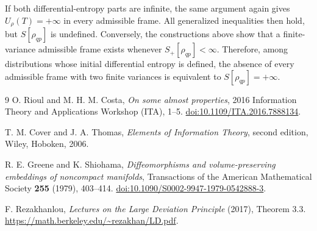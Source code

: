 \documentclass{techbrief}
\begin{document}
If both differential-entropy parts are infinite, the same argument again gives $U_\rho(T)=+\infty$ in every admissible frame. All generalized inequalities then hold, but $S[\rho_{qp}]$ is undefined. Conversely, the constructions above show that a finite-variance admissible frame exists whenever $S_+[\rho_{qp}]<\infty$. Therefore, among distributions whose initial differential entropy is defined, the absence of every admissible frame with two finite variances is equivalent to $S[\rho_{qp}]=+\infty$.\label{measurableAppendixEnd}

\fi

\begin{thebibliography}{9}
	O. Rioul and M. H. M. Costa, \emph{On some almost properties}, 2016 Information Theory and Applications Workshop (ITA), 1--5.
	\href{https://doi.org/10.1109/ITA.2016.7888134}{doi:10.1109/ITA.2016.7888134}.

	T. M. Cover and J. A. Thomas, \emph{Elements of Information Theory}, second edition, Wiley, Hoboken, 2006.

	R. E. Greene and K. Shiohama, \emph{Diffeomorphisms and volume-preserving embeddings of noncompact manifolds}, Transactions of the American Mathematical Society \textbf{255} (1979), 403--414.
	\href{https://doi.org/10.1090/S0002-9947-1979-0542888-3}{doi:10.1090/S0002-9947-1979-0542888-3}.

	F. Rezakhanlou, \emph{Lectures on the Large Deviation Principle} (2017), Theorem 3.3.
	\url{https://math.berkeley.edu/~rezakhan/LD.pdf}.
\end{thebibliography}
\end{document}
